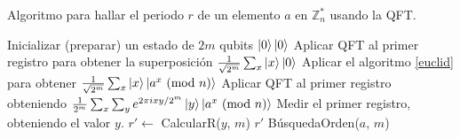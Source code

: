 \documentclass[11pt, spanish]{report}
\makeatletter
\numberwithin{equation}{section}
\newtheorem{lema}[defin]{Lema}
\numberwithin{defin}{section}
\newenvironment{megaalgorithm}[1][htb]{%
    \renewcommand{\ALG@name}{Algoritmo}%
   \begin{algorithm}[#1]%
  }{\end{algorithm}}
\newenvironment{yellowBox}{\begin{tcolorbox}[colback=yellow!5!white,colframe=yellow!75!black]}{\end{tcolorbox}}
\makeatother
\begin{document}
%
%
%
%
%
%

\begin{megaalgorithm}[h]
\caption{Algoritmo para hallar el periodo $r$ de un elemento $a$ en $\mathbb{Z}^*_n$ usando la QFT.}
\begin{algorithmic}[1]
\State Inicializar (preparar) un estado de $2m$ qubits $\ket{0}\ket{0}$
\State Aplicar QFT al primer registro para obtener la superposición $\frac{1}{\sqrt{2^m}}\sum_{x}\ket{x}\ket{0}$
\State Aplicar el algoritmo \ref{euclid} para obtener $\frac{1}{\sqrt{2^m}}\sum_{x}\ket{x}\ket{a^x\ (\text{mod }n)}$
\State Aplicar QFT al primer registro obteniendo $\frac{1}{2^m}\sum_{x}\sum_{y}e^{2\pi i x y/2^m}\ket{y}\ket{a^x\ (\text{mod }n)}$
\State Medir el primer registro, obteniendo el valor $y$. 
\State $r' \leftarrow$ CalcularR($y$, $m$)
 \Return $r'$
\Else \hspace{0.1cm} \Return BúsquedaOrden($a$, $m$)
\EndIf

\EndProcedure
\end{algorithmic}
\end{megaalgorithm}
\end{document}
